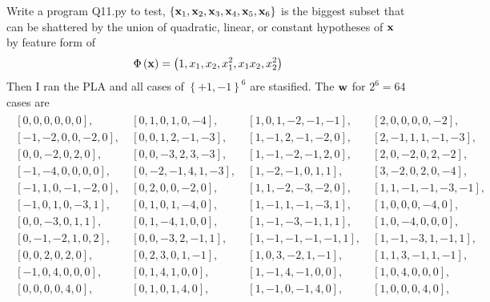 \documentclass[12pt]{article}
\newcommand{\CBrackets}[1]{\left\{#1\right\}}
\newcommand{\ParTh}[1]{\left(#1\right)}
\newcommand{\BF}[1]{{\bf#1}}
\begin{document}
Write a program Q11.py to test, $\CBrackets{\BF{x}_1,\BF{x}_2,\BF{x}_3,\BF{x}_4,\BF{x}_5,\BF{x}_6}$ is the biggest subset that can be shattered by the union of quadratic, linear, or constant hypotheses of $\BF{x}$ by feature form of
\begin{align}
\Phi\ParTh{\BF{x}}=\ParTh{1,x_1,x_2,x^2_1,x_1x_2,x^2_2}
\end{align}
Then I ran the PLA and all cases of $\CBrackets{+1,-1}^6$ are stasified. The $\BF{w}$ for $2^6=64$ cases are
\begin{align}
\begin{array}{llll}
\left[ 0,  0,  0,  0,  0,  0\right],~&\left[ 0,  1,  0,  1,  0, -4\right],~&\left[ 1,  0,  1, -2, -1, -1\right],~&\left[ 2,  0,  0,  0,  0, -2\right],\\
\left[-1, -2,  0,  0, -2,  0\right],~&\left[ 0,  0,  1,  2, -1, -3\right],~&\left[ 1, -1,  2, -1, -2,  0\right],~&\left[ 2, -1,  1,  1, -1, -3\right],\\
\left[ 0,  0, -2,  0,  2,  0\right],~&\left[ 0,  0, -3,  2,  3, -3\right],~&\left[ 1, -1, -2, -1,  2,  0\right],~&\left[ 2,  0, -2,  0,  2, -2\right],\\
\left[-1, -4,  0,  0,  0,  0\right],~&\left[ 0, -2, -1,  4,  1, -3\right],~&\left[ 1, -2, -1,  0,  1,  1\right],~&\left[ 3, -2,  0,  2,  0, -4\right],\\
\left[-1,  1,  0, -1, -2,  0\right],~&\left[ 0,  2,  0,  0, -2,  0\right],~&\left[ 1,  1, -2, -3, -2,  0\right],~&\left[ 1,  1, -1, -1, -3, -1\right],\\
\left[-1,  0,  1,  0, -3,  1\right],~&\left[ 0,  1,  0,  1, -4,  0\right],~&\left[ 1, -1,  1, -1, -3,  1\right],~&\left[ 1,  0,  0,  0, -4,  0\right],\\
\left[ 0,  0, -3,  0,  1,  1\right],~&\left[ 0,  1, -4,  1,  0,  0\right],~&\left[ 1, -1, -3, -1,  1,  1\right],~&\left[ 1,  0, -4,  0,  0,  0\right],\\
\left[ 0, -1, -2,  1,  0,  2\right],~&\left[ 0,  0, -3,  2, -1,  1\right],~&\left[ 1, -1, -1, -1, -1,  1\right],~&\left[ 1, -1, -3,  1, -1,  1\right],\\
\left[ 0,  0,  2,  0,  2,  0\right],~&\left[ 0,  2,  3,  0,  1, -1\right],~&\left[ 1,  0,  3, -2,  1, -1\right],~&\left[ 1,  1,  3, -1,  1, -1\right],\\
\left[-1,  0,  4,  0,  0,  0\right],~&\left[ 0,  1,  4,  1,  0,  0\right],~&\left[ 1, -1,  4, -1,  0,  0\right],~&\left[ 1,  0,  4,  0,  0,  0\right],\\
\left[ 0,  0,  0,  0,  4,  0\right],~&\left[ 0,  1,  0,  1,  4,  0\right],~&\left[ 1, -1,  0, -1,  4,  0\right],~&\left[ 1,  0,  0,  0,  4,  0\right],\\

\end{array}
\end{align}
\end{document}
